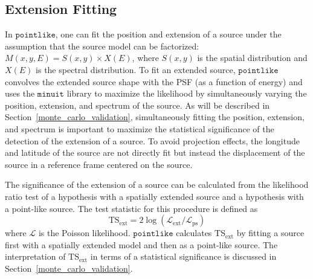 \documentclass[12pt,preprint]{aastex}
\newcommand{\tsext}{{\ensuremath{\text{TS}_{\text{ext}}}}\xspace}
\newcommand{\likelihood}{\ensuremath{\mathcal{L}}\xspace}
\newcommand{\pointlike}{\ensuremath{\mathtt{pointlike}}\xspace}
\newcommand{\minuit}{\ensuremath{\mathtt{minuit}}\xspace}
\begin{document}
\subsection{Extension Fitting}
\label{extension_fitting}

In \pointlike, one can fit the position and extension 
of a source under the assumption that the source model
can be factorized:
$M(x,y,E)=S(x,y)\times X(E)$, where $S(x,y)$ is the spatial distribution
and $X(E)$ is the spectral distribution.  To fit an extended source,
\pointlike convolves the extended source shape with the PSF (as a function
of energy) and uses the \minuit library \citep{minuit_documentation}
to maximize the likelihood by simultaneously varying the position,
extension, and spectrum of the source.  As will be described in
Section~\ref{monte_carlo_validation}, simultaneously fitting the
position, extension, and spectrum is important to maximize
the statistical significance of the detection of the extension of a source.
To avoid projection effects, the longitude and latitude 
of the source are
not directly fit but instead the displacement of the source 
in a reference frame centered on the source.

The significance of the extension of a source can be calculated from the
likelihood ratio test of a hypothesis with a spatially extended source and
a hypothesis with a point-like source. The test statistic for this procedure
is defined as
\begin{equation}
  \tsext=2\log(\likelihood_\text{ext}/\likelihood_\text{ps}) 
\end{equation}
where \likelihood is the Poisson likelihood.
\pointlike calculates \tsext by fitting a source first with a spatially
extended model and then as a point-like source.  The interpretation
of \tsext in terms of a statistical significance is discussed in
Section~\ref{monte_carlo_validation}.
\end{document}
